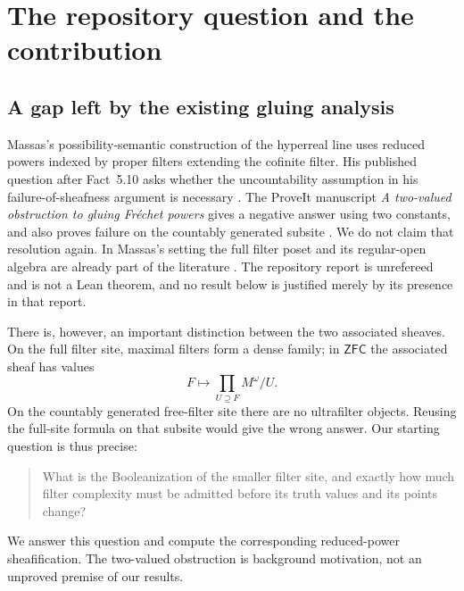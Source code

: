 \documentclass[11pt,letterpaper]{article}
\theoremstyle{definition}
\theoremstyle{remark}
\newcommand{\om}{\omega}
\newcommand{\ZFC}{\mathsf{ZFC}}
\begin{document}
\section{The repository question and the contribution}
\label{fbc:sec:scope}

\subsection{A gap left by the existing gluing analysis}
Massas's possibility-semantic construction of the hyperreal line uses
reduced powers indexed by proper filters extending the cofinite filter.
His published question after Fact~5.10 asks whether the uncountability
assumption in his failure-of-sheafness argument is necessary
\cite[p.~517]{Massas}. The ProveIt manuscript
\emph{A two-valued obstruction to gluing Fr\'echet powers} gives a
negative answer using two constants, and also proves failure on the
countably generated subsite \cite{Repo}. We do not claim that resolution
again. In Massas's setting the full filter poset and its regular-open
algebra are already part of the literature
\cite[Sections~5.2 and~6.1]{Massas}. The repository report is
unrefereed and is not a Lean theorem, and no result below is justified
merely by its presence in that report.

There is, however, an important distinction between the two associated
sheaves. On the full filter site, maximal filters form a dense family;
in $\ZFC$ the associated sheaf has values
\[
 F\longmapsto\prod_{U\supseteq F} M^\om/U.
\]
On the countably generated free-filter site there are no ultrafilter
objects. Reusing the full-site formula on that subsite would give the
wrong answer. Our starting question is thus precise:
\begin{quote}
What is the Booleanization of the smaller filter site, and exactly how
much filter complexity must be admitted before its truth values and its
points change?
\end{quote}
We answer this question and compute the corresponding reduced-power
sheafification. The two-valued obstruction is background motivation,
not an unproved premise of our results.
\end{document}
